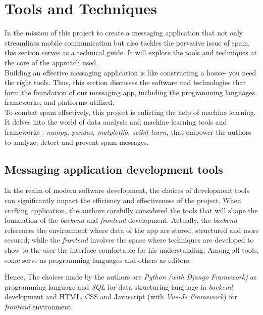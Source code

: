 \documentclass[12pt,a4paper]{report}
\begin{document}
   
    
   \section{Tools and Techniques} 
	In the mission of this project to create a messaging application that not only streamlines mobile communication but also tackles the pervasive issue of spam, this section serves as a technical guide. It will explore the tools and techniques at the core of the approach used. \\
		
	Building an effective messaging application is like constructing a house- you need the right tools. Thus, this section discusses the software and technologies that form the foundation of our messaging app, including the programming languages, frameworks, and platforms utilized. \\
	
	To combat spam effectively, this project is enlisting the help of machine learning. It delves into the world of data analysis and machine learning tools and frameworks : \textit{numpy, pandas, matplotlib, scikit-learn,} that empower the authors to analyze, detect and prevent spam messages.\\
	
	\subsection{Messaging application development tools}
	In the realm of modern software development, the choices of development tools can significantly impact the efficiency and effectiveness of the project. When crafting application, the authors carefully considered the tools that will shape the foundation of the \textit{backend} and \textit{frontend} development. Actually, the \textit{backend} references the environment where data of the app are stored, structured and more secured; while the \textit{frontend} involves the space where techniques are developed to show to the user the interface comfortable for his understanding. Among all tools, some serve as programming languages and others as editors. 
	
	Hence, The choices made by the authors are \textit{Python (with Django \textit{Framework})} as programming language and \textit{SQL} for data structuring language in \textit{backend} development and HTML, CSS and Javascript (with \textit{Vue-Js Framework}) for \textit{frontend} environment. \\
	
\end{document}
